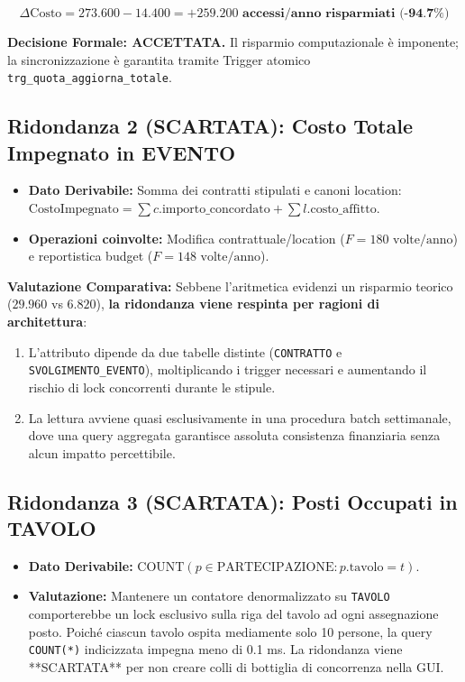 \[ \Delta \text{Costo} = 273.600 - 14.400 = \mathbf{+259.200 \text{ accessi/anno risparmiati (-94.7\%)}} \]

\textbf{Decisione Formale: ACCETTATA.} Il risparmio computazionale è imponente; la sincronizzazione è garantita tramite Trigger atomico \texttt{trg\_quota\_aggiorna\_totale}.

\subsection{Ridondanza 2 (SCARTATA): Costo Totale Impegnato in EVENTO}
\begin{itemize}[noitemsep]
    \item \textbf{Dato Derivabile:} Somma dei contratti stipulati e canoni location:
    $\text{CostoImpegnato} = \sum c.\text{importo\_concordato} + \sum l.\text{costo\_affitto}$.
    \item \textbf{Operazioni coinvolte:} Modifica contrattuale/location ($F = 180 \text{ volte/anno}$) e reportistica budget ($F = 148 \text{ volte/anno}$).
\end{itemize}

\textbf{Valutazione Comparativa:}
Sebbene l'aritmetica evidenzi un risparmio teorico ($29.960$ vs $6.820$), \textbf{la ridondanza viene respinta per ragioni di architettura}:
\begin{enumerate}[noitemsep]
    \item L'attributo dipende da due tabelle distinte (\texttt{CONTRATTO} e \texttt{SVOLGIMENTO\_EVENTO}), moltiplicando i trigger necessari e aumentando il rischio di lock concorrenti durante le stipule.
    \item La lettura avviene quasi esclusivamente in una procedura batch settimanale, dove una query aggregata garantisce assoluta consistenza finanziaria senza alcun impatto percettibile.
\end{enumerate}

\subsection{Ridondanza 3 (SCARTATA): Posti Occupati in TAVOLO}
\begin{itemize}[noitemsep]
    \item \textbf{Dato Derivabile:} $\text{COUNT}(p \in \text{PARTECIPAZIONE} : p.\text{tavolo} = t)$.
    \item \textbf{Valutazione:} Mantenere un contatore denormalizzato su \texttt{TAVOLO} comporterebbe un lock esclusivo sulla riga del tavolo ad ogni assegnazione posto. Poiché ciascun tavolo ospita mediamente solo 10 persone, la query \texttt{COUNT(*)} indicizzata impegna meno di 0.1 ms. La ridondanza viene **SCARTATA** per non creare colli di bottiglia di concorrenza nella GUI.
\end{itemize}

